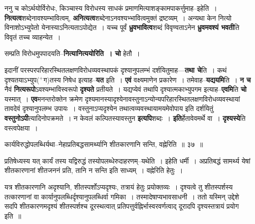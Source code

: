 \documentclass[article,12pt,a4paper]{memoir}
\newcommand{\add}[1]{($^{+}$#1)}
\begin{document}
	  \pstart ननु च कोऽर्थयोर्विरोधः, किञ्चास्य विरोधस्य साधकं प्रमाणमित्याशङ्कामपाकर्त्तुमाह--इहेति । \textbf{नित्यत्व}शब्देनावश्यम्भावित्वम्, \textbf{अनित्यत्व}शब्देनाऽनवश्यभ्भावित्वमुक्तं द्रष्टव्यम् । अन्यथा केन नित्यो विनाशोऽभ्युपेतो येनास्याऽनित्यताऽपोद्येत । यच्च पूर्वं \textbf{ध्रुवभावित्व}शब्दं विवृण्वताऽनेन \textbf{ध्रुवमवश्यं भवती}ति विवृतं तच्च व्याहन्येत ।
	\pend
      

	  \pstart सम्प्रति विरोधमुपपादयति--\textbf{नित्यानित्ययोरिति । चो} हेतौ ।
	\pend
      

	  \pstart इदानीं परस्परपरिहारस्थितलक्षणविरोधव्यवस्थापकं दृश्यानुपलम्भं दर्शयितुमाह—\textbf{तथा चे}ति । कथं दृश्यतयाऽभ्युप\add{ग}तस्य निषेध इत्याह--\textbf{यत} इति । \textbf{एवं} वक्ष्यमाणेन प्रकारेण । तमेवाह--\textbf{यद्ययमि}ति । \textbf{न च} नैवं \textbf{नित्यरूपो}ऽवश्यम्भाविस्वरूपो \textbf{दृश्यते} प्रतीयते । यद्यप्येवं तथापि दृश्यात्मकाभ्युपगम इत्याह--\textbf{एवमि}ति \textbf{चो} यस्मात् । \textbf{एव}मनन्तरोक्तेन क्रमेण दृश्यमानस्यादृश्येनावस्तुनाऽन्योन्यपरिहारस्थितलक्षणविरोधव्यवस्थायां तावदेवं दृश्यानुपलम्भ उपायः । वस्तुनाऽप्यदृश्येन तथात्वव्यवस्थायामयमेवोपाय इति दर्शयितुं \textbf{वस्तुनोऽपी}त्यादिनोपक्रमते । न केवलं कल्पितस्यावस्तुन \textbf{इत्यपि}शब्दः । \textbf{इति}र्हेतावेवमर्थे वा । \textbf{दृश्यस्ये}ति वस्त्वपेक्षया ।
	\pend
	  \bigskip
	  \begingroup
	
	  \bigskip
	  \begingroup
	

	  \pstart कार्यविरुद्धोपलब्धिर्यथा--नेहाप्रतिबद्धसामर्थ्यानि शीतकारणानि सन्ति, वह्नेरिति ॥ ३७ ॥
	\pend
      
	  \endgroup
	 

	  \pstart प्रतिषेध्यस्य यत् कार्यं तस्य यद्विरुद्धं तस्योपलब्धेरुदाहरणम्--यथेति । इहेति धर्मी । अप्रतिबद्धं सामर्थ्य येषां शीतकारणानां शीतजननं प्रति, तानि न सन्ति इति साध्यम् । वह्नेरिति हेतुः ।
	\pend
        

	  \pstart यत्र शीतकारणानि अदृश्यानि, शीतस्पर्शोऽप्यदृश्यः, तत्रायं हेतुः प्रयोक्तव्यः । दृश्यत्वे तु शीतस्पर्शस्य तत्कारणानां वा कार्यानुपलब्धिर्दृश्यानुपलब्धिर्वा गमिका । तस्मादेषाप्यभावसाधनी । ततो यस्मिन् उद्देशे सदपि शीतकारणमदृश्यं शीतस्पर्शश्च दूरस्थत्वात् प्रतिपत्तुर्वह्निर्भास्वरवर्णत्वाद् दूरादपि दृश्यस्तत्रायं प्रयोग इति ॥
	\pend
      
\end{document}
